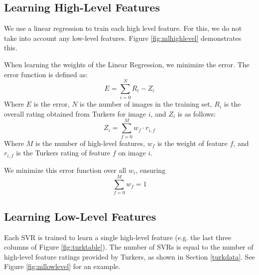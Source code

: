 \documentclass[11pt,letter]{article}
\begin{document}
\subsection{Learning High-Level Features}
\begin{figure*}[h!]
  \centering
  \caption{This is an example of how the linear regression for high level features is trained. During training, each sample is a set of ratings for high level features and an overall quality rating, both acquired from Turk. When predicting, the high level features are outputted by the SVRs (see Section \ref{llfeat}).}
  \label{fig:mlhighlevel}
\end{figure*}
We use a linear regression to train each high level feature. For this, we do not take into account any low-level features. Figure \ref{fig:mlhighlevel} demonstrates this.

When learning the weights of the Linear Regression, we minimize the error. The error function is defined as:
\[
E=\displaystyle\sum\limits_{i=0}^N R_i-Z_i
\]
Where $E$ is the error, $N$ is the number of images in the training set, $R_i$ is the overall rating obtained from Turkers for image $i$, and $Z_i$ is as follows:
\[
Z_i=\displaystyle\sum\limits_{f=0}^M w_f \cdot r_{i,f}
\]
Where $M$ is the number of high-level features, $w_f$ is the weight of feature $f$, and $r_{i,f}$ is the Turkers rating of feature $f$ on image $i$.

We minimize this error function over all $w_i$, ensuring
\[
\displaystyle\sum\limits_{f=0}^M w_f = 1
\]


\subsection{Learning Low-Level Features}
\label{llfeat}
\begin{figure*}[h!]
  \centering
  \caption{This is an example of how the ensemble of SVRs for low level features are trained. Each sample is a set of low level features (calculated by the application) and a label (acquired from Turkers). The prediction is a set of ratings per high level feature.}
  \label{fig:mllowlevel}
\end{figure*}

Each SVR is trained to learn a single high-level feature (e.g. the last three columns of Figure \ref{fig:turktable}). The number of SVRs is equal to the number of high-level feature ratings provided by Turkers, as shown in Section \ref{turkdata}. See Figure \ref{fig:mllowlevel} for an example.
\end{document}
